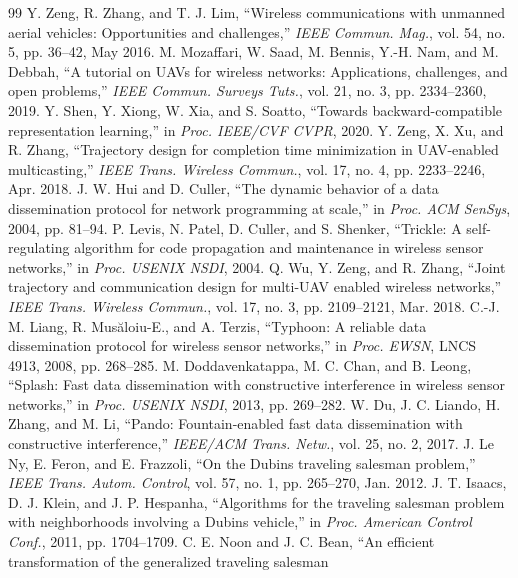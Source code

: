\begin{thebibliography}{99}
 Y. Zeng, R. Zhang, and T. J. Lim, ``Wireless communications with unmanned aerial vehicles:
Opportunities and challenges,'' \emph{IEEE Commun. Mag.}, vol. 54, no. 5, pp. 36--42, May 2016.
 M. Mozaffari, W. Saad, M. Bennis, Y.-H. Nam, and M. Debbah, ``A tutorial on UAVs for wireless
networks: Applications, challenges, and open problems,'' \emph{IEEE Commun. Surveys Tuts.}, vol. 21, no. 3,
pp. 2334--2360, 2019.
 Y. Shen, Y. Xiong, W. Xia, and S. Soatto, ``Towards backward-compatible representation learning,'' in
\emph{Proc. IEEE/CVF CVPR}, 2020.
 Y. Zeng, X. Xu, and R. Zhang, ``Trajectory design for completion time minimization in
UAV-enabled multicasting,'' \emph{IEEE Trans. Wireless Commun.}, vol. 17, no. 4, pp. 2233--2246, Apr. 2018.
 J. W. Hui and D. Culler, ``The dynamic behavior of a data dissemination protocol for network
programming at scale,'' in \emph{Proc. ACM SenSys}, 2004, pp. 81--94.
 P. Levis, N. Patel, D. Culler, and S. Shenker, ``Trickle: A self-regulating algorithm for code
propagation and maintenance in wireless sensor networks,'' in \emph{Proc. USENIX NSDI}, 2004.
 Q. Wu, Y. Zeng, and R. Zhang, ``Joint trajectory and communication design for multi-UAV enabled wireless
networks,'' \emph{IEEE Trans. Wireless Commun.}, vol. 17, no. 3, pp. 2109--2121, Mar. 2018.
 C.-J. M. Liang, R. Mus\u{a}loiu-E., and A. Terzis, ``Typhoon: A reliable data dissemination
protocol for wireless sensor networks,'' in \emph{Proc. EWSN}, LNCS 4913, 2008, pp. 268--285.
 M. Doddavenkatappa, M. C. Chan, and B. Leong, ``Splash: Fast data dissemination with
constructive interference in wireless sensor networks,'' in \emph{Proc. USENIX NSDI}, 2013, pp. 269--282.
 W. Du, J. C. Liando, H. Zhang, and M. Li, ``Pando: Fountain-enabled fast data dissemination with
constructive interference,'' \emph{IEEE/ACM Trans. Netw.}, vol. 25, no. 2, 2017.
 J. Le Ny, E. Feron, and E. Frazzoli, ``On the Dubins traveling salesman problem,'' \emph{IEEE Trans.
Autom. Control}, vol. 57, no. 1, pp. 265--270, Jan. 2012.
 J. T. Isaacs, D. J. Klein, and J. P. Hespanha, ``Algorithms for the traveling salesman problem with
neighborhoods involving a Dubins vehicle,'' in \emph{Proc. American Control Conf.}, 2011, pp. 1704--1709.
 C. E. Noon and J. C. Bean, ``An efficient transformation of the generalized traveling salesman

\end{thebibliography}
